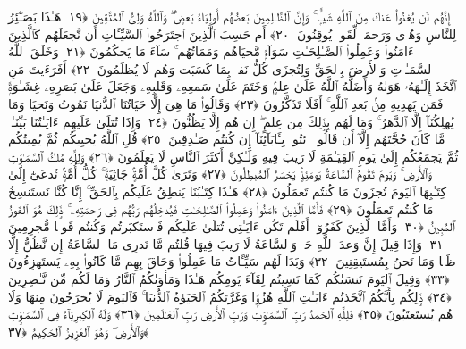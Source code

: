  إِنَّهُم لَن يُغنُوا۟ عَنكَ مِنَ ٱللَّهِ شَيـًۭٔا ۚ وَإِنَّ ٱلظَّـٰلِمِينَ بَعضُهُم أَولِيَآءُ بَعضٍۢ ۖ وَٱللَّهُ وَلِىُّ ٱلمُتَّقِينَ ﴿١٩﴾
 هَـٰذَا بَصَـٰٓئِرُ لِلنَّاسِ وَهُدًۭى وَرَحمَةٌۭ لِّقَومٍۢ يُوقِنُونَ ﴿٢٠﴾
 أَم حَسِبَ ٱلَّذِينَ ٱجتَرَحُوا۟ ٱلسَّيِّـَٔاتِ أَن نَّجعَلَهُم كَٱلَّذِينَ ءَامَنُوا۟ وَعَمِلُوا۟ ٱلصَّـٰلِحَـٰتِ سَوَآءًۭ مَّحيَاهُم وَمَمَاتُهُم ۚ سَآءَ مَا يَحكُمُونَ ﴿٢١﴾
 وَخَلَقَ ٱللَّهُ ٱلسَّمَـٰوَٟتِ وَٱلأَرضَ بِٱلحَقِّ وَلِتُجزَىٰ كُلُّ نَفسٍۭ بِمَا كَسَبَت وَهُم لَا يُظلَمُونَ ﴿٢٢﴾
 أَفَرَءَيتَ مَنِ ٱتَّخَذَ إِلَـٰهَهُۥ هَوَىٰهُ وَأَضَلَّهُ ٱللَّهُ عَلَىٰ عِلمٍۢ وَخَتَمَ عَلَىٰ سَمعِهِۦ وَقَلبِهِۦ وَجَعَلَ عَلَىٰ بَصَرِهِۦ غِشَـٰوَةًۭ فَمَن يَهدِيهِ مِنۢ بَعدِ ٱللَّهِ ۚ أَفَلَا تَذَكَّرُونَ ﴿٢٣﴾
 وَقَالُوا۟ مَا هِىَ إِلَّا حَيَاتُنَا ٱلدُّنيَا نَمُوتُ وَنَحيَا وَمَا يُهلِكُنَآ إِلَّا ٱلدَّهرُ ۚ وَمَا لَهُم بِذَٟلِكَ مِن عِلمٍ ۖ إِن هُم إِلَّا يَظُنُّونَ ﴿٢٤﴾
 وَإِذَا تُتلَىٰ عَلَيهِم ءَايَـٰتُنَا بَيِّنَـٰتٍۢ مَّا كَانَ حُجَّتَهُم إِلَّآ أَن قَالُوا۟ ٱئتُوا۟ بِـَٔابَآئِنَآ إِن كُنتُم صَـٰدِقِينَ ﴿٢٥﴾
 قُلِ ٱللَّهُ يُحيِيكُم ثُمَّ يُمِيتُكُم ثُمَّ يَجمَعُكُم إِلَىٰ يَومِ ٱلقِيَـٰمَةِ لَا رَيبَ فِيهِ وَلَـٰكِنَّ أَكثَرَ ٱلنَّاسِ لَا يَعلَمُونَ ﴿٢٦﴾
 وَلِلَّهِ مُلكُ ٱلسَّمَـٰوَٟتِ وَٱلأَرضِ ۚ وَيَومَ تَقُومُ ٱلسَّاعَةُ يَومَئِذٍۢ يَخسَرُ ٱلمُبطِلُونَ ﴿٢٧﴾
 وَتَرَىٰ كُلَّ أُمَّةٍۢ جَاثِيَةًۭ ۚ كُلُّ أُمَّةٍۢ تُدعَىٰٓ إِلَىٰ كِتَـٰبِهَا ٱليَومَ تُجزَونَ مَا كُنتُم تَعمَلُونَ ﴿٢٨﴾
 هَـٰذَا كِتَـٰبُنَا يَنطِقُ عَلَيكُم بِٱلحَقِّ ۚ إِنَّا كُنَّا نَستَنسِخُ مَا كُنتُم تَعمَلُونَ ﴿٢٩﴾
 فَأَمَّا ٱلَّذِينَ ءَامَنُوا۟ وَعَمِلُوا۟ ٱلصَّـٰلِحَـٰتِ فَيُدخِلُهُم رَبُّهُم فِى رَحمَتِهِۦ ۚ ذَٟلِكَ هُوَ ٱلفَوزُ ٱلمُبِينُ ﴿٣٠﴾
 وَأَمَّا ٱلَّذِينَ كَفَرُوٓا۟ أَفَلَم تَكُن ءَايَـٰتِى تُتلَىٰ عَلَيكُم فَٱستَكبَرتُم وَكُنتُم قَومًۭا مُّجرِمِينَ ﴿٣١﴾
 وَإِذَا قِيلَ إِنَّ وَعدَ ٱللَّهِ حَقٌّۭ وَٱلسَّاعَةُ لَا رَيبَ فِيهَا قُلتُم مَّا نَدرِى مَا ٱلسَّاعَةُ إِن نَّظُنُّ إِلَّا ظَنًّۭا وَمَا نَحنُ بِمُستَيقِنِينَ ﴿٣٢﴾
 وَبَدَا لَهُم سَيِّـَٔاتُ مَا عَمِلُوا۟ وَحَاقَ بِهِم مَّا كَانُوا۟ بِهِۦ يَستَهزِءُونَ ﴿٣٣﴾
 وَقِيلَ ٱليَومَ نَنسَىٰكُم كَمَا نَسِيتُم لِقَآءَ يَومِكُم هَـٰذَا وَمَأوَىٰكُمُ ٱلنَّارُ وَمَا لَكُم مِّن نَّـٰصِرِينَ ﴿٣٤﴾
 ذَٟلِكُم بِأَنَّكُمُ ٱتَّخَذتُم ءَايَـٰتِ ٱللَّهِ هُزُوًۭا وَغَرَّتكُمُ ٱلحَيَوٰةُ ٱلدُّنيَا ۚ فَٱليَومَ لَا يُخرَجُونَ مِنهَا وَلَا هُم يُستَعتَبُونَ ﴿٣٥﴾
 فَلِلَّهِ ٱلحَمدُ رَبِّ ٱلسَّمَـٰوَٟتِ وَرَبِّ ٱلأَرضِ رَبِّ ٱلعَـٰلَمِينَ ﴿٣٦﴾
 وَلَهُ ٱلكِبرِيَآءُ فِى ٱلسَّمَـٰوَٟتِ وَٱلأَرضِ ۖ وَهُوَ ٱلعَزِيزُ ٱلحَكِيمُ ﴿٣٧﴾
 

